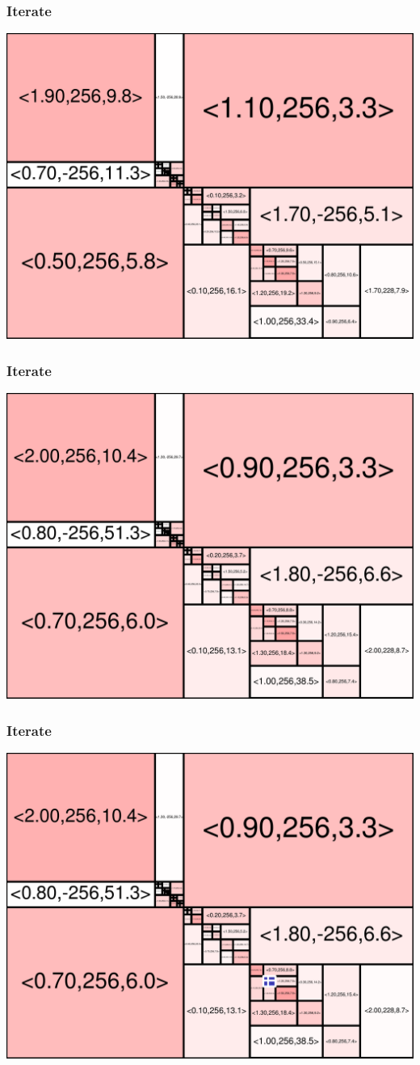 \begin{frame}
\frametitle{Iterate}\begin{centering}\includegraphics[width=8.5 cm]{remy-graph/graph/test69.pdf}

\end{centering}\end{frame}


\begin{frame}
\frametitle{Iterate}\begin{centering}\includegraphics[width=8.5 cm]{remy-graph/graph/test70.pdf}

\end{centering}\end{frame}


\begin{frame}
\frametitle{Iterate}\begin{centering}\includegraphics[width=8.5 cm]{remy-graph/graph/test71.pdf}

\end{centering}\end{frame}



